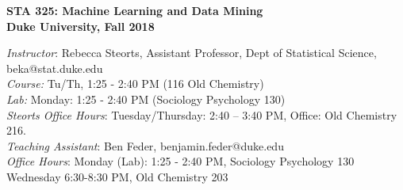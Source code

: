 \documentclass[11pt]{article}
\date{}
\begin{document}

\begin{center}
{\Large\bf STA 325: Machine Learning and Data Mining} \\

{\Large\bf Duke University, Fall 2018} \\
\end{center}



\emph{Instructor}: Rebecca Steorts,  Assistant Professor, Dept of Statistical Science, beka@stat.duke.edu\\
\emph{Course:} Tu/Th, 1:25 - 2:40 PM (116 Old Chemistry)\\
\emph{Lab:} Monday: 1:25 - 2:40 PM (Sociology Psychology 130) \\
\emph{Steorts Office Hours}: Tuesday/Thursday: 2:40 -- 3:40 PM, Office: Old Chemistry 216.\\

\emph{Teaching Assistant}: Ben Feder, benjamin.feder@duke.edu\\
\emph{Office Hours}: Monday (Lab): 1:25 - 2:40 PM, Sociology Psychology 130\\Wednesday 6:30-8:30 PM,  Old Chemistry  203 \\

%
\end{document}
